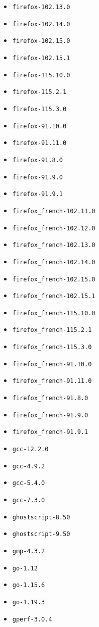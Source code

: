 \begin{itemize}
\item \verb|firefox-102.13.0|
\item \verb|firefox-102.14.0|
\item \verb|firefox-102.15.0|
\item \verb|firefox-102.15.1|
\item \verb|firefox-115.10.0|
\item \verb|firefox-115.2.1|
\item \verb|firefox-115.3.0|
\item \verb|firefox-91.10.0|
\item \verb|firefox-91.11.0|
\item \verb|firefox-91.8.0|
\item \verb|firefox-91.9.0|
\item \verb|firefox-91.9.1|
\item \verb|firefox_french-102.11.0|
\item \verb|firefox_french-102.12.0|
\item \verb|firefox_french-102.13.0|
\item \verb|firefox_french-102.14.0|
\item \verb|firefox_french-102.15.0|
\item \verb|firefox_french-102.15.1|
\item \verb|firefox_french-115.10.0|
\item \verb|firefox_french-115.2.1|
\item \verb|firefox_french-115.3.0|
\item \verb|firefox_french-91.10.0|
\item \verb|firefox_french-91.11.0|
\item \verb|firefox_french-91.8.0|
\item \verb|firefox_french-91.9.0|
\item \verb|firefox_french-91.9.1|
\item \verb|gcc-12.2.0|
\item \verb|gcc-4.9.2|
\item \verb|gcc-5.4.0|
\item \verb|gcc-7.3.0|
\item \verb|ghostscript-8.50|
\item \verb|ghostscript-9.50|
\item \verb|gmp-4.3.2|
\item \verb|go-1.12|
\item \verb|go-1.15.6|
\item \verb|go-1.19.3|
\item \verb|gperf-3.0.4|

\end{itemize}

